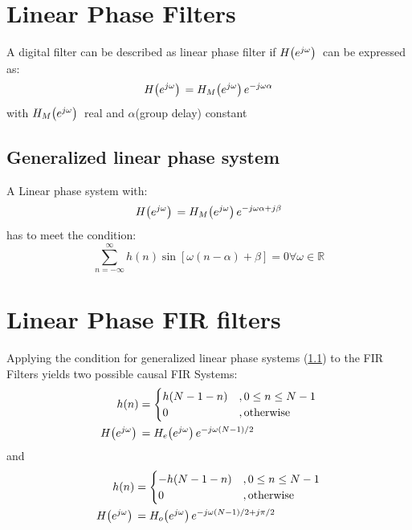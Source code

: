 \documentclass[accentcolor=tud4c,9.5pt,nochapname,bigchapter,paper=a5report]{tudreport}
\begin{document}
\section{Linear Phase Filters}
A digital filter can be described as linear phase filter if $H{\left(e^{j\omega}\right)}\,$ can be expressed as:
\begin{equation}
	H{\left(e^{j\omega}\right)}\, = H_M{\left(e^{j\omega}\right)}\, e^{-j\omega \alpha}
\end{equation} 
with $H_M{\left(e^{j\omega}\right)}\,$ real and $\alpha$(group delay) constant 

\subsection{Generalized linear phase system} \label{genLPS}
A Linear phase system with:
\begin{equation}
	H{\left(e^{j\omega}\right)}\, = H_M{\left(e^{j\omega}\right)}\, e^{-j\omega \alpha + j\beta}
\end{equation}
has to meet the condition:
\begin{equation} 
	\sum\limits_{n=-\infty}^{\infty} h(n)\sin[\omega (n-\alpha )+\beta] = 0 \forall \omega \in \mathbb{R}
\end{equation}

\section {Linear Phase FIR filters}
Applying the condition for generalized linear phase systems (\ref{genLPS}) to the FIR Filters yields two possible causal FIR Systems:
\begin{subequations}
\begin{align}
h(n) &= \begin{cases}
h(N-1-n)	&,0\leq n \leq N-1 \\
0			&,\text{otherwise} 
\end{cases} \\
H{\left(e^{j\omega}\right)}\, &= H_e{\left(e^{j\omega}\right)}\, e^{-j\omega (N-1)/2}
\end{align}
\end{subequations}
{\center and}
\begin{subequations}
\begin{align}
h(n) &= \begin{cases}
-h(N-1-n)	&,0\leq n \leq N-1 \\
0			&,\text{otherwise} 
\end{cases} \\
H{\left(e^{j\omega}\right)}\, &= H_o{\left(e^{j\omega}\right)}\, e^{-j\omega (N-1)/2+j\pi /2}
\end{align}
\end{subequations}
\end{document}

